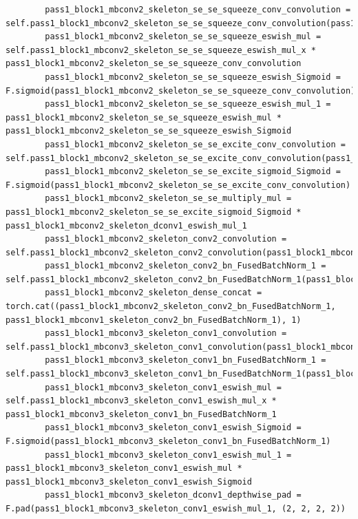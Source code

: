 \documentclass{fisatprojectfinal}
\begin{document}
\begin{appendices}
\begin{lstlisting}
        pass1_block1_mbconv2_skeleton_se_se_squeeze_conv_convolution = self.pass1_block1_mbconv2_skeleton_se_se_squeeze_conv_convolution(pass1_block1_mbconv2_skeleton_se_se_squeeze_lambda_Mean)
        pass1_block1_mbconv2_skeleton_se_se_squeeze_eswish_mul = self.pass1_block1_mbconv2_skeleton_se_se_squeeze_eswish_mul_x * pass1_block1_mbconv2_skeleton_se_se_squeeze_conv_convolution
        pass1_block1_mbconv2_skeleton_se_se_squeeze_eswish_Sigmoid = F.sigmoid(pass1_block1_mbconv2_skeleton_se_se_squeeze_conv_convolution)
        pass1_block1_mbconv2_skeleton_se_se_squeeze_eswish_mul_1 = pass1_block1_mbconv2_skeleton_se_se_squeeze_eswish_mul * pass1_block1_mbconv2_skeleton_se_se_squeeze_eswish_Sigmoid
        pass1_block1_mbconv2_skeleton_se_se_excite_conv_convolution = self.pass1_block1_mbconv2_skeleton_se_se_excite_conv_convolution(pass1_block1_mbconv2_skeleton_se_se_squeeze_eswish_mul_1)
        pass1_block1_mbconv2_skeleton_se_se_excite_sigmoid_Sigmoid = F.sigmoid(pass1_block1_mbconv2_skeleton_se_se_excite_conv_convolution)
        pass1_block1_mbconv2_skeleton_se_se_multiply_mul = pass1_block1_mbconv2_skeleton_se_se_excite_sigmoid_Sigmoid * pass1_block1_mbconv2_skeleton_dconv1_eswish_mul_1
        pass1_block1_mbconv2_skeleton_conv2_convolution = self.pass1_block1_mbconv2_skeleton_conv2_convolution(pass1_block1_mbconv2_skeleton_se_se_multiply_mul)
        pass1_block1_mbconv2_skeleton_conv2_bn_FusedBatchNorm_1 = self.pass1_block1_mbconv2_skeleton_conv2_bn_FusedBatchNorm_1(pass1_block1_mbconv2_skeleton_conv2_convolution)
        pass1_block1_mbconv2_skeleton_dense_concat = torch.cat((pass1_block1_mbconv2_skeleton_conv2_bn_FusedBatchNorm_1, pass1_block1_mbconv1_skeleton_conv2_bn_FusedBatchNorm_1), 1)
        pass1_block1_mbconv3_skeleton_conv1_convolution = self.pass1_block1_mbconv3_skeleton_conv1_convolution(pass1_block1_mbconv2_skeleton_dense_concat)
        pass1_block1_mbconv3_skeleton_conv1_bn_FusedBatchNorm_1 = self.pass1_block1_mbconv3_skeleton_conv1_bn_FusedBatchNorm_1(pass1_block1_mbconv3_skeleton_conv1_convolution)
        pass1_block1_mbconv3_skeleton_conv1_eswish_mul = self.pass1_block1_mbconv3_skeleton_conv1_eswish_mul_x * pass1_block1_mbconv3_skeleton_conv1_bn_FusedBatchNorm_1
        pass1_block1_mbconv3_skeleton_conv1_eswish_Sigmoid = F.sigmoid(pass1_block1_mbconv3_skeleton_conv1_bn_FusedBatchNorm_1)
        pass1_block1_mbconv3_skeleton_conv1_eswish_mul_1 = pass1_block1_mbconv3_skeleton_conv1_eswish_mul * pass1_block1_mbconv3_skeleton_conv1_eswish_Sigmoid
        pass1_block1_mbconv3_skeleton_dconv1_depthwise_pad = F.pad(pass1_block1_mbconv3_skeleton_conv1_eswish_mul_1, (2, 2, 2, 2))

\end{lstlisting}
\end{appendices}
\end{document}
